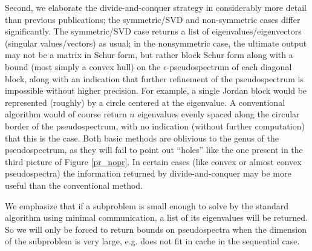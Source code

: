\documentclass{article}
\theoremstyle{definition}
\begin{document}
Second, we elaborate the divide-and-conquer strategy in considerably more detail than previous publications; the symmetric/SVD and non-symmetric cases differ significantly. The symmetric/SVD case returns a list of eigenvalues/eigenvectors (singular values/vectors) as usual; in the nonsymmetric case, the ultimate output may not be a matrix in Schur form, but rather block Schur form along with a bound (most simply a convex hull) on the $\epsilon$-pseudospectrum of each diagonal block, along with an indication that further refinement of the pseudospectrum is impossible without higher precision. For example, a single Jordan block would be represented (roughly) by a circle centered at the eigenvalue. A conventional algorithm would of course return $n$ eigenvalues evenly spaced along the circular border of the pseudospectrum, with no indication (without further computation) that this is the case.  Both basic methods are oblivious to the genus of the pseudospectrum, as they will fail to point out ``holes'' like the one present in the third picture of Figure \ref{pr_nopr}. In certain cases (like convex or almost convex pseudospectra) the information returned by divide-and-conquer may be more useful than the conventional method.

We emphasize that if a subproblem is small enough to solve by the standard algorithm using minimal communication, a list of its eigenvalues will be returned. So we will only be forced to return bounds on pseudospectra when the dimension of the subproblem is very large, e.g. does not fit in cache in the sequential case.   




\end{document}
